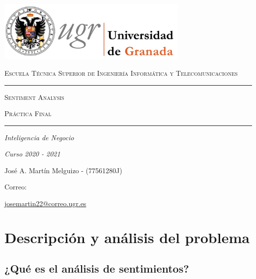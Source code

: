 \documentclass[a4paper,12pt]{report}
\begin{document}
\begin{titlepage}
    \centering
    {\includegraphics[width=0.7\textwidth]{images/ugr.jpeg}\par}
    \vspace{1cm}
    {\scshape\Large Escuela Técnica Superior de Ingeniería Informática y Telecomunicaciones \par}
    \vspace{2.5cm}
    \hrule height 0.5pt
    \vspace{0.5cm}
    {\scshape\Huge Sentiment Analysis \par}
    \vspace{1cm}
    {\scshape\large Práctica Final \par}
    \vspace{0.5cm}
    \hrule height 0.5pt
    \vspace{4cm}
    {\itshape\Large Inteligencia de Negocio \par}
    \vspace{0.2cm}
    {\itshape\Large Curso 2020 - 2021 \par}
    \vfill
    {\Large José A. Martín Melguizo - (77561280J) \par}
    \vspace{0.5cm}
    {\large Correo:} {\href{correo}{josemartin22@correo.ugr.es} \par}
    \vfill
    
\end{titlepage}


\clearpage
\tableofcontents
\clearpage

\chapter{Descripción y análisis del problema}

\section{¿Qué es el análisis de sentimientos?}
\end{document}

